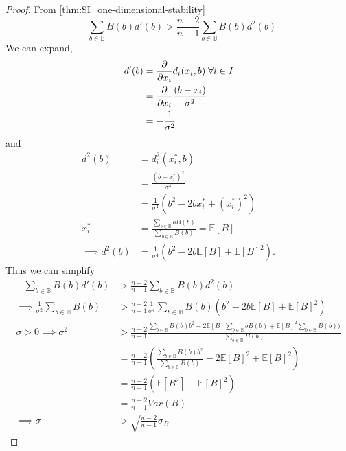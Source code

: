 \documentclass{article}
\newcommand {\B}{\mathbb{B}}
\begin{document}
            \begin{proof}
                From \cref{thm:SI_one-dimensional-stability}
                \begin{equation}
                     -\sum_{b\in \B} B(b)d'(b)>\frac{n-2}{n-1}\sum_{b\in \B} B(b)d^2(b)
                \end{equation}
                We can expand,
                \begin{align}
                    d'(b)&=\pdv{}{x_i}d_i(x_i,b)\; \forall i\in I \\ %
                    &=\pdv{}{x_i}\frac{(b-x_i)}{\sigma^2} \\ %
                    &=-\frac{1}{\sigma^2}
                \end{align}
                and 
                \begin{align}
                    d^2(b)&=d_i^2(x^*_i,b) \\ %
                    &=\frac{(b-x^*_i)^2}{\sigma^4} \\ %
                    &=\frac{1}{\sigma^4}(b^2-2bx^*_i+(x^*_i)^2) \\ %
                    x_i^*&=\frac{\sum_{b\in\B} bB(b)}{\sum_{b\in\B}B(b)}=\mathbb{E}[B] \\ %
                    \implies d^2(b)&=\frac{1}{\sigma^4}(b^2-2b\mathbb{E}[B]+\mathbb{E}[B]^2).
                \end{align}
                Thus we can simplify 
                \begin{align}
                      -\sum_{b\in \B} B(b)d'(b)&>\frac{n-2}{n-1}\sum_{b\in \B} B(b)d^2(b) \\ %
                      \implies \frac{1}{\sigma^2}\sum_{b\in \B} B(b)&>\frac{n-2}{n-1}\frac{1}{\sigma^4}\sum_{b\in \B} B(b)(b^2-2b\mathbb{E}[B]+\mathbb{E}[B]^2) \\ %
                     \sigma>0 \implies  \sigma^2&>\frac{n-2}{n-1}\frac{\sum_{b\in \B} B(b)b^2-2\mathbb{E}[B]\sum_{b\in \B} bB(b)+\mathbb{E}[B]^2\sum_{b\in \B} B(b))}{\sum_{b\in \B} B(b)} \\ %
                     &=\frac{n-2}{n-1}\left(\frac{\sum_{b\in \B} B(b)b^2}{{\sum_{b\in \B} B(b)}}-2\mathbb{E}[B]^2+\mathbb{E}[B]^2\right) \\ %
                     &=\frac{n-2}{n-1}\left(\mathbb{E}[B^2]-\mathbb{E}[B]^2\right) \\ %
                     &=\frac{n-2}{n-1}Var(B) \\ %
                     \implies \sigma&>\sqrt{\frac{n-2}{n-1}} \sigma_B
                \end{align}
            \end{proof}
\end{document}
